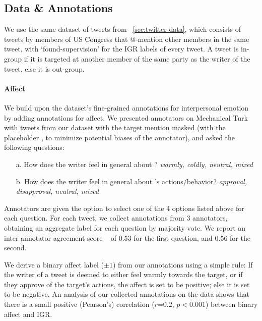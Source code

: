 \subsection{Data \& Annotations}
\label{subsec:data}

We use the same dataset of tweets from \textsection~\ref{sec:twitter-data}, which consists of tweets by members of US Congress that @-mention other members in the same tweet, with `found-supervision' for the IGR labels of every tweet. A tweet is in-group if it is targeted at another member of the same party as the writer of the tweet, else it is out-group.

\paragraph{Affect}
We build upon the dataset's fine-grained annotations for interpersonal emotion by adding annotations for affect. We presented annotators on Mechanical Turk with tweets from our dataset with the target mention masked (with the placeholder \@Doe, to minimize potential biases of the annotator), and asked the following questions:

\begin{enumerate}
    \item[a.] How does the writer feel in general about \@Doe? \emph{warmly, coldly, neutral, mixed}
    \item[b.] How does the writer feel in general about \@Doe's actions/behavior? \emph{approval, disapproval, neutral, mixed}
\end{enumerate}

Annotators are given the option to select one of the 4 options listed above for each question. For each tweet, we collect annotations from 3 annotators, obtaining an aggregate label for each question by majority vote. We report an inter-annotator agreement score ~\citep[Fleiss's kappa;][]{fleiss1971measuring} of 0.53 for the first question, and 0.56 for the second.

We derive a binary affect label ($\pm 1$) from our annotations using a simple rule: If the writer of a tweet is deemed to either feel warmly towards the target, or if they approve of the target's actions, the affect is set to be positive; else it is set to be negative. An analysis of our collected annotations on the data shows that there is a small positive (Pearson's) correlation ($r$=$0.2$, $p<0.001$) between binary affect and IGR.



